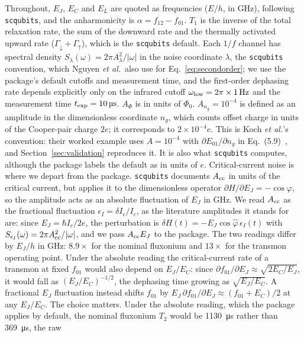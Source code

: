 \documentclass{SciPost}
\begin{document}
Throughout, $E_J$, $E_C$ and $E_L$ are quoted as frequencies ($E/h$, in GHz), following
\texttt{scqubits}, and the anharmonicity is $\alpha=f_{12}-f_{01}$. $T_1$ is the inverse of the total
relaxation rate, the sum of the downward rate and the thermally activated upward rate
($\Gamma_\downarrow+\Gamma_\uparrow$), which is the \texttt{scqubits} default. Each $1/f$ channel has spectral density $S_\lambda(\omega)=2\pi A_\lambda^2/|\omega|$ in the noise
coordinate $\lambda$, the \texttt{scqubits} convention, which Nguyen \emph{et al.}\ also use for
Eq.~\eqref{eq:secondorder}; we use the package's default cutoffs and measurement time, and the first-order dephasing rate depends
explicitly only on the infrared cutoff $\omega_{\rm low}=2\pi\times\SI{1}{\hertz}$ and the measurement time
$t_{\rm exp}=\SI{10}{\micro\second}$. $A_\Phi$ is in units of $\Phi_0$. $A_{n_g}=10^{-4}$ is defined as an amplitude in the dimensionless coordinate $n_g$, which counts
offset charge in units of the Cooper-pair charge $2e$; it corresponds to $2\times10^{-4}e$. This is
Koch \emph{et al.}'s convention: their worked example uses $A=10^{-4}$ with $\partial E_{01}/\partial n_g$
in Eq.~(5.9)~\cite{koch2007}, and Section~\ref{sec:validation} reproduces it. It is also what
\texttt{scqubits} computes, although the package labels the default as in units of $e$. Critical-current noise is where we depart from the package. \texttt{scqubits} documents $A_{\rm cc}$ in units of
the critical current, but applies it to the dimensionless operator $\partial H/\partial E_J=-\cos\varphi$,
so the amplitude acts as an absolute fluctuation of $E_J$ in GHz. We read $A_{\rm cc}$ as the fractional fluctuation $\epsilon_I=\delta I_c/I_c$, as the literature
amplitudes it stands for are: since $E_J=\hbar I_c/2e$, the perturbation is
$\delta H(t)=-E_J\cos\hat\varphi\,\epsilon_I(t)$ with $S_{\epsilon_I}(\omega)=2\pi A_{\rm cc}^2/|\omega|$, and we
pass $A_{\rm cc}E_J$ to the package. The two readings differ by $E_J/h$ in GHz: $8.9\times$ for the nominal fluxonium and
$13\times$ for the transmon operating point. Under the absolute reading the critical-current rate of a transmon at fixed $f_{01}$ would also
depend on $E_J/E_C$: since $\partial f_{01}/\partial E_J\approx\sqrt{2E_C/E_J}$, it would fall as
$(E_J/E_C)^{-1/2}$, the dephasing time growing as $\sqrt{E_J/E_C}$. A fractional $E_J$ fluctuation
instead shifts $f_{01}$ by $E_J\,\partial f_{01}/\partial E_J\approx(f_{01}+E_C)/2$ at any $E_J/E_C$.
The choice matters. Under the absolute reading, which the package applies by default, the nominal
fluxonium $T_2$ would be \SI{1130}{\micro\second} rather than \SI{369}{\micro\second}, the raw
\end{document}
